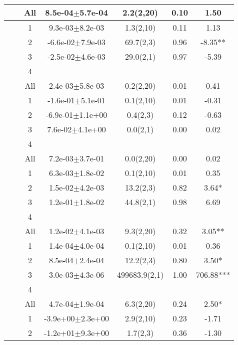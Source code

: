 \begin{longtable}{llccccS[table-format=-2.2, table-space-text-post = {***}]}
   &  & All &  8.5e-04$\pm$5.7e-04 & 2.2(2,20) & 0.10 & 1.50 \\ 
   \midrule
{} & {} & 1 &  9.3e-03$\pm$8.2e-03 & 1.3(2,10) & 0.11 & 1.13 \\ 
   &  & 2 & -6.6e-02$\pm$7.9e-03 & 69.7(2,3) & 0.96 & -8.35** \\ 
   &  & 3 & -2.5e-02$\pm$4.6e-03 & 29.0(2,1) & 0.97 & -5.39 \\ 
   &  & 4 &  &  &  &  \\ 
   &  & All &  2.4e-03$\pm$5.8e-03 & 0.2(2,20) & 0.01 & 0.41 \\ 
   \midrule
{} & {} & 1 & -1.6e-01$\pm$5.1e-01 & 0.1(2,10) & 0.01 & -0.31 \\ 
   &  & 2 & -6.9e-01$\pm$1.1e+00 & 0.4(2,3) & 0.12 & -0.63 \\ 
   &  & 3 &  7.6e-02$\pm$4.1e+00 & 0.0(2,1) & 0.00 & 0.02 \\ 
   &  & 4 &  &  &  &  \\ 
   &  & All &  7.2e-03$\pm$3.7e-01 & 0.0(2,20) & 0.00 & 0.02 \\ 
   \midrule
{} & {} & 1 &  6.3e-03$\pm$1.8e-02 & 0.1(2,10) & 0.01 & 0.35 \\ 
   &  & 2 &  1.5e-02$\pm$4.2e-03 & 13.2(2,3) & 0.82 & 3.64* \\ 
   &  & 3 &  1.2e-01$\pm$1.8e-02 & 44.8(2,1) & 0.98 & 6.69 \\ 
   &  & 4 &  &  &  &  \\ 
   &  & All &  1.2e-02$\pm$4.1e-03 & 9.3(2,20) & 0.32 & 3.05** \\ 
   \midrule
{} & {} & 1 &  1.4e-04$\pm$4.0e-04 & 0.1(2,10) & 0.01 & 0.36 \\ 
   &  & 2 &  8.5e-04$\pm$2.4e-04 & 12.2(2,3) & 0.80 & 3.50* \\ 
   &  & 3 &  3.0e-03$\pm$4.3e-06 & 499683.9(2,1) & 1.00 & 706.88*** \\ 
   &  & 4 &  &  &  &  \\ 
   &  & All &  4.7e-04$\pm$1.9e-04 & 6.3(2,20) & 0.24 & 2.50* \\ 
   \midrule
{} & {} & 1 & -3.9e+00$\pm$2.3e+00 & 2.9(2,10) & 0.23 & -1.71 \\ 
   &  & 2 & -1.2e+01$\pm$9.3e+00 & 1.7(2,3) & 0.36 & -1.30 \\ 

\end{longtable}
